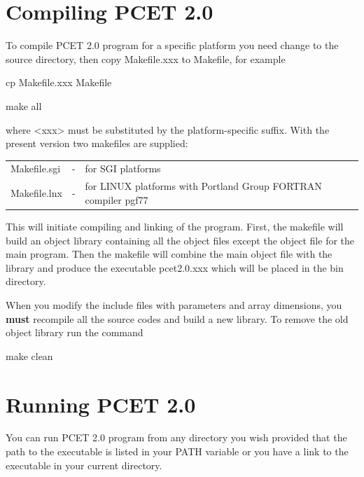 \documentclass[oneside,11pt,openany]{book}
\newcommand{\tw}{\ttfamily}
\begin{document}
\section{Compiling PCET 2.0}
To compile PCET 2.0 program for a specific platform you need
change to the {\tw source} directory, then
copy {\tw Makefile.xxx} to {\tw Makefile}, for example

\begin{description}
\item {\tw cp Makefile.xxx Makefile}
\item {\tw make all}
\end{description}

\noindent where {\tw <xxx>} must be substituted by
the platform-specific suffix. With the present version two
makefiles are supplied:
\par\noindent
\begin{tabular}{lcp{8cm}}
{\tw Makefile.sgi} &-& for SGI platforms \\
{\tw Makefile.lnx} &-& for LINUX platforms with Portland
      Group FORTRAN compiler {\tw pgf77} \\
\end{tabular}

This will initiate compiling and linking of the program. First,
the makefile will build an object library containing all the object
files except the object file for the main program. Then the
makefile will combine the main object file with the library
and produce the executable {\tw pcet2.0.xxx} which will
be placed in the {\tw bin} directory.

When you modify the include files with parameters and array
dimensions, you {\bf must} recompile all the source codes
and build a new library. To remove the old object library
run the command

\begin{description}
\item {\tw make clean}
\end{description}


\section{Running PCET 2.0}

You can run PCET 2.0 program from any directory you wish provided
that the path to the executable is listed in your {\tw PATH}
variable or you have a link to the executable in your current
directory.
\end{document}
